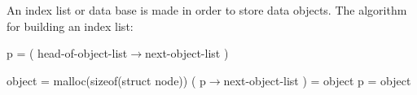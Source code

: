 \documentclass[15pt,a4paper,oneside]{article}
\begin{document}
An index list or data base is made in order to store data objects. The algorithm for building an index list:
\begin{algorithm}[H]\begin{algorithmic}
\STATE p = ( head-of-object-list$\rightarrow$next-object-list )
\end{algorithmic}\end{algorithm}
\begin{algorithm}[H]\begin{algorithmic}
\STATE object = malloc(sizeof(struct node))
\STATE ( p$\rightarrow$next-object-list ) = object
\STATE p = object
\ENDIF
\end{algorithmic}\end{algorithm}
\end{document}
